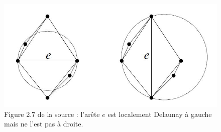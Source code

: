 \documentclass[12pt,a4paper]{report}
\begin{document}
\begin{figure}[h]
\begin{center}
\includegraphics[scale=0.65]{locDel.jpg}
\caption{Figure 2.7 de la source \cite{delnotes} : l'arête $e$ est localement Delaunay à gauche mais ne l'est pas à droite.}\label{locDelaunay}
\end{center}
\end{figure}
\end{document}
